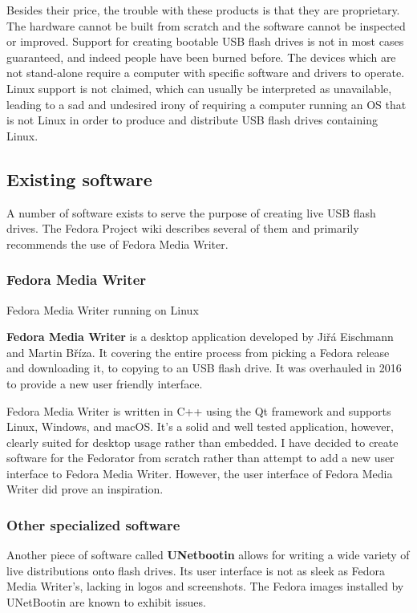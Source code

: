             Besides their price, the trouble with these products is that they are proprietary.  The hardware cannot be built from scratch and the software cannot be inspected or improved.  Support for creating bootable USB flash drives is not in most cases guaranteed, and indeed people have been burned before\cite{open-security-research-simple-duplicator}.  The devices which are not stand-alone require a computer with specific software and drivers to operate.  Linux support is not claimed, which can usually be interpreted as unavailable, leading to a sad and undesired irony of requiring a computer running an OS that is not Linux in order to produce and distribute USB flash drives containing Linux.
        \subsection{Existing software}
            A number of software exists to serve the purpose of creating live USB flash drives.  The Fedora Project wiki describes several of them and primarily recommends the use of Fedora Media Writer\cite{fedora-how-to-live-usb}.
            
            \subsubsection{Fedora Media Writer}
                    {Fedora Media Writer running on Linux \cite{fedora-media-writer-screenshot}}
                
                \textbf{Fedora Media Writer} is a desktop application developed by  Jiřá Eischmann and Martin Bříza.  It covering the entire process from picking a Fedora release and downloading it, to copying to an USB flash drive.  It was overhauled in 2016 to provide a new user friendly interface\cite{fedora-luc-as-primary-downloadable}.
                
                Fedora Media Writer is written in C++ using the Qt framework and supports Linux, Windows, and macOS\cite{fedora-media-writer}.  It's a solid and well tested application, however, clearly suited for desktop usage rather than embedded.  I have decided to create software for the Fedorator from scratch rather than attempt to add a new user interface to Fedora Media Writer.  However, the user interface of Fedora Media Writer did prove an inspiration.
                
            \subsubsection{Other specialized software}
                Another piece of software called \textbf{UNetbootin} allows for writing a wide variety of live distributions onto flash drives.  Its user interface is not as sleek as Fedora Media Writer's, lacking in logos and screenshots.  The Fedora images installed by UNetBootin are known to exhibit issues\cite{fedora-how-to-live-usb}\cite{unix-stack-exchange-error-installing-fedora-24}.
            

